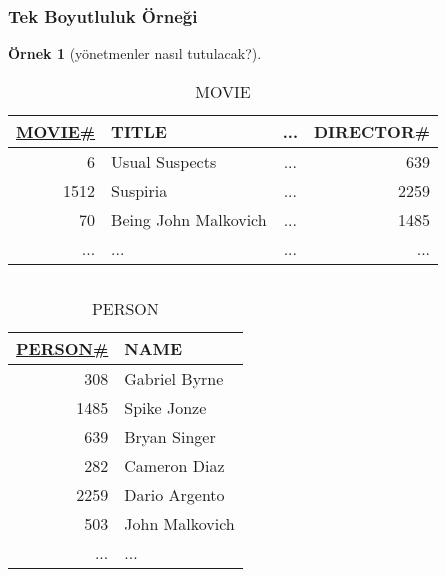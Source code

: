 \documentclass[dvipsnames]{beamer}
\theoremstyle{definition}
\theoremstyle{example}
\newtheorem{ornek}[theorem]{Örnek}
\theoremstyle{plain}
\begin{document}
\begin{frame}
  \frametitle{Tek Boyutluluk Örneği}

  \begin{ornek}[yönetmenler nasıl tutulacak?]
    \begin{tiny}
    \begin{table}
      \caption{MOVIE}
      \begin{tabular}{|r|l|c|r|}\hline
\underline{MOVIE\#} & TITLE                & ... & DIRECTOR\#\\[2pt]\hline\hline
                  6 & Usual Suspects       & ... &        639\\\hline
               1512 & Suspiria             & ... &       2259\\\hline
                 70 & Being John Malkovich & ... &       1485\\\hline
                ... & ...                  & ... &        ...\\\hline
      \end{tabular}
    \end{table}
    \end{tiny}

    \vspace{-12pt}
    \begin{columns}[t]
      \begin{tiny}
      \begin{table}
        \caption{PERSON}
        \begin{tabular}{|r|l|}\hline
\underline{PERSON\#} & NAME          \\[2pt]\hline\hline
                 308 & Gabriel Byrne \\\hline
                1485 & Spike Jonze   \\\hline
                 639 & Bryan Singer  \\\hline
                 282 & Cameron Diaz  \\\hline
                2259 & Dario Argento \\\hline
                 503 & John Malkovich\\\hline
                 ... & ...           \\\hline
        \end{tabular}
      \end{table}
      \end{tiny}


\end{columns}
\end{ornek}
\end{frame}
\end{document}
